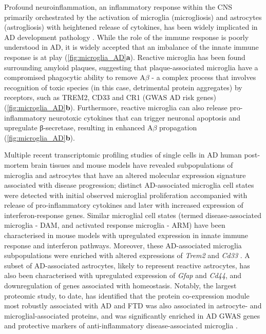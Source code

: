 Profound neuroinflammation, an inflammatory response within the CNS primarily orchestrated by the activation of microglia (microgliosis) and astrocytes (astrogliosis) with heightened release of cytokines, has been widely implicated in AD development pathology \cite{Cisbani2021,Griciuc2021}. While the role of the immune response is poorly understood in AD, it is widely accepted that an imbalance of the innate immune response is at play\cite{Frost2019} (\cref{fig:microglia_AD}\textbf{a}). Reactive microglia has been found surrounding amyloid plaques\cite{PL1987}, suggesting that plaque-associated microglia have a compromised phagocytic ability to remove A$\beta$\cite{Mawuenyega2010} - a complex process that involves recognition of toxic species (in this case, detrimental protein aggregates) by receptors, such as TREM2, CD33 and CR1 (GWAS AD risk genes) (\cref{fig:microglia_AD}\textbf{b}). Furthermore, reactive microglia can also release pro-inflammatory neurotoxic cytokines that can trigger neuronal apoptosis\cite{Qin2002,Wang2015b} and upregulate β-secretase\cite{Chen2012}, resulting in enhanced A$\beta$ propagation (\cref{fig:microglia_AD}\textbf{b}).  

Multiple recent transcriptomic profiling studies of single cells in AD human post-mortem brain tissues\cite{Mathys2019,Nott2019,Thrupp2020,Olah2020,Leng2021,Young2021} and mouse models\cite{Keren-Shaul2017,Mathys2017} have revealed subpopulations of microglia and astrocytes that have an altered molecular expression signature associated with disease progression; distinct AD-associated microglia cell states were detected with initial observed microglial proliferation accompanied with release of pro-inflammatory cytokines and later with increased expression of interferon-response genes\cite{Mathys2017}. Similar microglial cell states (termed disease-associated microglia - DAM\cite{Keren-Shaul2017}, and activated response microglia - ARM\cite{Frigerio2019}) have been characterised in mouse models with upregulated expression in innate immune response and interferon pathways. Moreover, these AD-associated microglia subpopulations were enriched with altered expressions of \textit{Trem2} and \textit{Cd33} \cite{Mathys2019,Frigerio2019}. A subset of AD-associated astrocytes, likely to represent reactive astrocytes, has also been characterised with upregulated expression of \textit{Gfap} and \textit{Cd44}, and downregulation of genes associated with homeostasis\cite{Leng2021}. Notably, the largest proteomic study, to date, has identified that the protein co-expression module most robustly associated with AD and FTD was also associated in astrocyte- and microglial-associated proteins, and was significantly enriched in AD GWAS genes and protective markers of anti-inflammatory disease-associated microglia \cite{Johnson2020}.    

